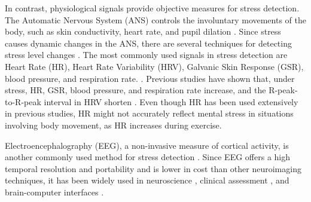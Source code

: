 \documentclass[journal]{IEEEtran}
\begin{document}
In contrast, physiological signals provide objective measures for stress detection. 
The Automatic Nervous System (ANS) controls the involuntary movements of the body, such as skin conductivity, heart rate, and pupil dilation \cite{langley1921ANS, sharma2012stress_measure, beatty2000stress_pupil}.
Since stress causes dynamic changes in the ANS, there are several techniques for detecting stress level changes \cite{giannakakis2019stress_review_physiological_change, sharma2012stress_measure}.
The most commonly used signals in stress detection are Heart Rate (HR), Heart Rate Variability (HRV), Galvanic Skin Response (GSR), blood pressure, and respiration rate. \cite{Shruti2021_review_stress_detection}.
Previous studies have shown that, under stress, HR, GSR, blood pressure, and respiration rate increase, and the R-peak-to-R-peak interval in HRV shorten \cite{giannakakis2019stress_review_physiological_change, sharma2012stress_measure}.
Even though HR has been used extensively in previous studies, HR might not accurately reflect mental stress in situations involving body movement, as HR increases during exercise.

Electroencephalography (EEG), a non-invasive measure of cortical activity, is another commonly used method for stress detection \cite{sharma2012stress_measure}.
Since EEG offers a high temporal resolution and portability and is lower in cost than other neuroimaging techniques, it has been widely used in neuroscience \cite{grummett2014_gamma,Artoni2017}, clinical assessment \cite{marzbani2016_review_BCN}, and brain-computer interfaces \cite{Fabiani2004}.

\end{document}
